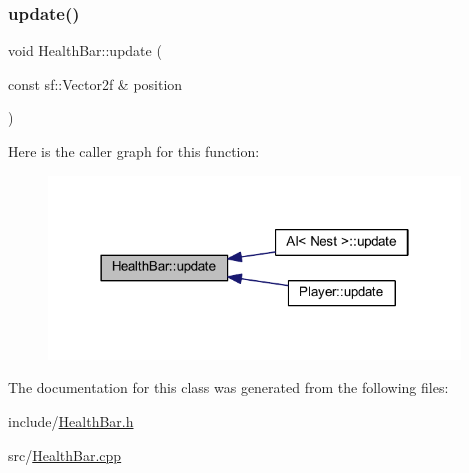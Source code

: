 \subsubsection{\texorpdfstring{update()}{update()}}
{\footnotesize\ttfamily void Health\+Bar\+::update (\begin{DoxyParamCaption}\item[{const sf\+::\+Vector2f \&}]{position }\end{DoxyParamCaption})}

Here is the caller graph for this function\+:
\nopagebreak
\begin{figure}[H]
\begin{center}
\leavevmode
\includegraphics[width=310pt]{class_health_bar_a07c96f51c5742055c496f1dcc5959402_icgraph}
\end{center}
\end{figure}


The documentation for this class was generated from the following files\+:\begin{DoxyCompactItemize}
\item 
include/\hyperlink{_health_bar_8h}{Health\+Bar.\+h}\item 
src/\hyperlink{_health_bar_8cpp}{Health\+Bar.\+cpp}\end{DoxyCompactItemize}
